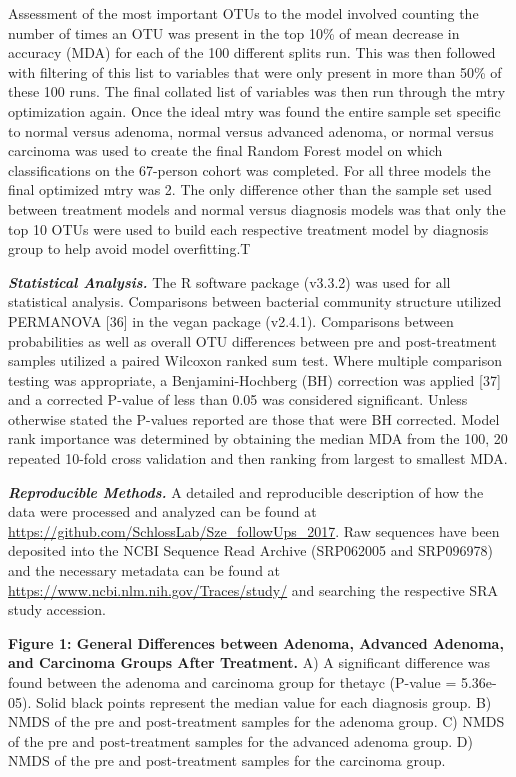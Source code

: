 \documentclass[12pt,]{article}
\begin{document}
Assessment of the most important OTUs to the model involved counting the
number of times an OTU was present in the top 10\% of mean decrease in
accuracy (MDA) for each of the 100 different splits run. This was then
followed with filtering of this list to variables that were only present
in more than 50\% of these 100 runs. The final collated list of
variables was then run through the mtry optimization again. Once the
ideal mtry was found the entire sample set specific to normal versus
adenoma, normal versus advanced adenoma, or normal versus carcinoma was
used to create the final Random Forest model on which classifications on
the 67-person cohort was completed. For all three models the final
optimized mtry was 2. The only difference other than the sample set used
between treatment models and normal versus diagnosis models was that
only the top 10 OTUs were used to build each respective treatment model
by diagnosis group to help avoid model overfitting.T

\textbf{\emph{Statistical Analysis.}} The R software package (v3.3.2)
was used for all statistical analysis. Comparisons between bacterial
community structure utilized PERMANOVA {[}36{]} in the vegan package
(v2.4.1). Comparisons between probabilities as well as overall OTU
differences between pre and post-treatment samples utilized a paired
Wilcoxon ranked sum test. Where multiple comparison testing was
appropriate, a Benjamini-Hochberg (BH) correction was applied {[}37{]}
and a corrected P-value of less than 0.05 was considered significant.
Unless otherwise stated the P-values reported are those that were BH
corrected. Model rank importance was determined by obtaining the median
MDA from the 100, 20 repeated 10-fold cross validation and then ranking
from largest to smallest MDA.

\textbf{\emph{Reproducible Methods.}} A detailed and reproducible
description of how the data were processed and analyzed can be found at
\url{https://github.com/SchlossLab/Sze_followUps_2017}. Raw sequences
have been deposited into the NCBI Sequence Read Archive (SRP062005 and
SRP096978) and the necessary metadata can be found at
\url{https://www.ncbi.nlm.nih.gov/Traces/study/} and searching the
respective SRA study accession.

\newpage

\textbf{Figure 1: General Differences between Adenoma, Advanced Adenoma,
and Carcinoma Groups After Treatment.} A) A significant difference was
found between the adenoma and carcinoma group for thetayc (P-value =
5.36e-05). Solid black points represent the median value for each
diagnosis group. B) NMDS of the pre and post-treatment samples for the
adenoma group. C) NMDS of the pre and post-treatment samples for the
advanced adenoma group. D) NMDS of the pre and post-treatment samples
for the carcinoma group.
\end{document}
